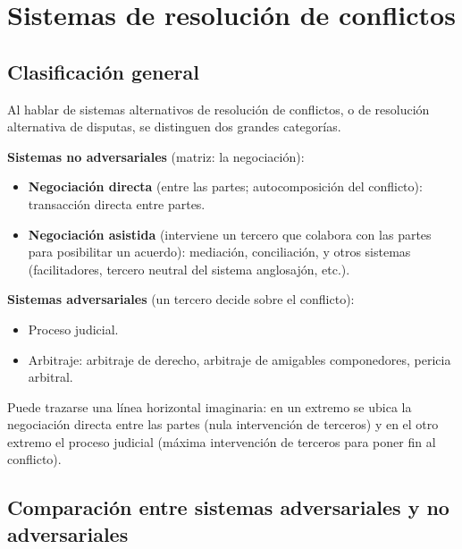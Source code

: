\documentclass[12pt,oneside]{book}
\begin{document}
\chapter{Sistemas de resolución de conflictos}

\section{Clasificación general}

Al hablar de sistemas alternativos de resolución de conflictos, o de resolución alternativa de disputas, se distinguen dos grandes categorías.

\begin{important}
\textbf{Sistemas no adversariales} (matriz: la negociación):
\begin{itemize}
    \item \textbf{Negociación directa} (entre las partes; autocomposición del conflicto): transacción directa entre partes.
    \item \textbf{Negociación asistida} (interviene un tercero que colabora con las partes para posibilitar un acuerdo): mediación, conciliación, y otros sistemas (facilitadores, tercero neutral del sistema anglosajón, etc.).
\end{itemize}

\textbf{Sistemas adversariales} (un tercero decide sobre el conflicto):
\begin{itemize}
    \item Proceso judicial.
    \item Arbitraje: arbitraje de derecho, arbitraje de amigables componedores, pericia arbitral.
\end{itemize}
\end{important}

Puede trazarse una línea horizontal imaginaria: en un extremo se ubica la negociación directa entre las partes (nula intervención de terceros) y en el otro extremo el proceso judicial (máxima intervención de terceros para poner fin al conflicto).

\section{Comparación entre sistemas adversariales y no adversariales}
\end{document}
